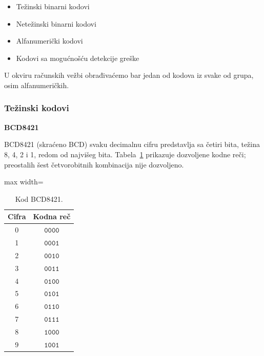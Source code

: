 \documentclass[a4paper,11pt]{article}
\numberwithin{equation}{section}
\newcommand{\redlinija}{\arrayrulecolor{black!28}\specialrule{0.3pt}{2pt}{2pt}\arrayrulecolor{black}}
\begin{document}
\begin{itemize}[leftmargin=*]
\item Težinski binarni kodovi

\item Netežinski binarni kodovi

\item Alfanumerički kodovi

\item Kodovi sa mogućnošću detekcije greške

\end{itemize}


U okviru računskih vežbi obrađivaćemo bar jedan od kodova iz svake od grupa, osim alfanumeričkih.



\subsubsection{Težinski kodovi}\label{sec:1.1.1}


\textbf{BCD8421}



BCD8421 (skraćeno BCD) svaku decimalnu cifru predstavlja sa četiri bita, težina 8, 4, 2 i 1, redom od najvišeg bita. Tabela~\ref{tab:bcd} prikazuje dozvoljene kodne reči; preostalih šest četvorobitnih kombinacija nije dozvoljeno.

\begin{table}[!htbp]\centering\caption{Kod BCD8421.}\label{tab:bcd}
\begin{adjustbox}{max width=\linewidth}\begin{tabular}{cc}\toprule
Cifra & Kodna reč\\\midrule
0 & $\mathtt{0000}$\\
\redlinija
1 & $\mathtt{0001}$\\
\redlinija
2 & $\mathtt{0010}$\\
\redlinija
3 & $\mathtt{0011}$\\
\redlinija
4 & $\mathtt{0100}$\\
\redlinija
5 & $\mathtt{0101}$\\
\redlinija
6 & $\mathtt{0110}$\\
\redlinija
7 & $\mathtt{0111}$\\
\redlinija
8 & $\mathtt{1000}$\\
\redlinija
9 & $\mathtt{1001}$\\
\bottomrule\end{tabular}\end{adjustbox}
\end{table}
\end{document}
